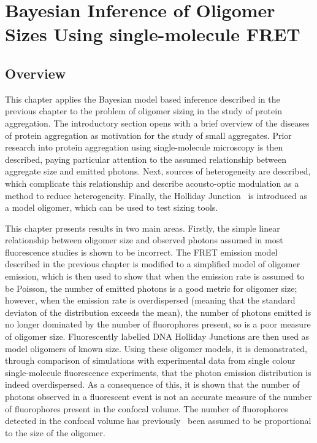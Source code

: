 \chapter{Bayesian Inference of Oligomer Sizes Using single-molecule FRET}
\label{chap:sizing}

\section{Overview}
This chapter applies the Bayesian model based inference described in the previous chapter to the problem of oligomer sizing in the study of protein aggregation. The introductory section opens with a brief overview of the diseases of protein aggregation as motivation for the study of small aggregates. Prior research into protein aggregation using single-molecule microscopy is then described, paying particular attention to the assumed relationship between aggregate size and emitted photons. Next, sources of heterogeneity are described, which complicate this relationship and describe acousto-optic modulation as a method to reduce heterogeneity. Finally, the Holliday Junction~\cite{holliday1964} is introduced as a model oligomer, which can be used to test sizing tools.

This chapter presents results in two main areas. Firstly, the simple linear relationship between oligomer size and observed photons assumed in most fluorescence studies is shown to be incorrect. The FRET emission model described in the previous chapter is modified to a simplified model of oligomer emission, which is then used to show that when the emission rate is assumed to be Poisson, the number of emitted photons is a good metric for oligomer size; however, when the emission rate is overdispersed (meaning that the standard deviaton of the distribution exceeds the mean), the number of photons emitted is no longer dominated by the number of fluorophores present, so is a poor measure of oligomer size. Fluorescently labelled DNA Holliday Junctions are then used as model oligomers of known size. Using these oligomer models, it is demonstrated, through comparison of simulations with experimental data from single colour single-molecule fluorescence experiments, that the photon emission distribution is indeed overdispersed. As a consequence of this, it is shown that the number of photons observed in a fluorescent event is not an accurate measure of the number of fluorophores present in the confocal volume. The number of fluorophores detected in the confocal volume has previously~\cite{orte08, cremades2012} been assumed to be proportional to the size of the oligomer. 

